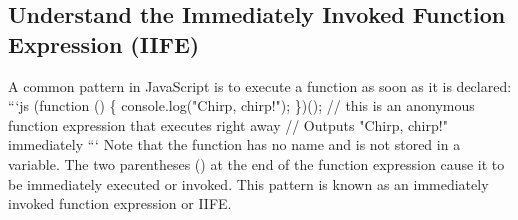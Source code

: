 \documentclass{article}%
\begin{document}
\subsection{Understand the Immediately Invoked Function Expression (IIFE)}%
\label{subsec:UnderstandtheImmediatelyInvokedFunctionExpression(IIFE)}%
A common pattern in JavaScript is to execute a function as soon as it is declared:\newline%
```js\newline%
(function () \{\newline%
  console.log("Chirp, chirp!");\newline%
\})(); // this is an anonymous function expression that executes right away\newline%
// Outputs "Chirp, chirp!" immediately\newline%
```\newline%
Note that the function has no name and is not stored in a variable. The two parentheses () at the end of the function expression cause it to be immediately executed or invoked. This pattern is known as an immediately invoked function expression or IIFE.\newline%

%
\end{document}
